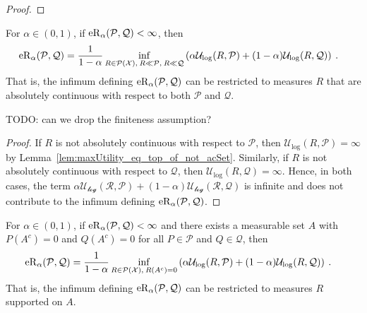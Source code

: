 \begin{proof}\leanok

\end{proof}


\begin{lemma}\label{lem:erenyiDiv_eq_iInf_acSet}
For $\alpha \in (0,1)$, if $\operatorname{eR}_\alpha(\mathcal{P}, \mathcal{Q}) < \infty$, then
\begin{align*}
  \operatorname{eR}_\alpha(\mathcal{P}, \mathcal{Q})
  &= \frac{1}{1 - \alpha} \inf_{R \in \mathcal{P}(\mathcal{X}), \: R \ll \mathcal{P}, \: R \ll \mathcal{Q}} \left( \alpha \mathcal{U}_{\log}(R, \mathcal{P}) + (1 - \alpha) \mathcal{U}_{\log}(R, \mathcal{Q}) \right)
  \: .
\end{align*}
That is, the infimum defining $\operatorname{eR}_\alpha(\mathcal{P}, \mathcal{Q})$ can be restricted to measures $R$ that are absolutely continuous with respect to both $\mathcal{P}$ and $\mathcal{Q}$.

TODO: can we drop the finiteness assumption?
\end{lemma}

\begin{proof}
If $R$ is not absolutely continuous with respect to $\mathcal{P}$, then $\mathcal{U}_{\log}(R, \mathcal{P}) = \infty$ by Lemma~\ref{lem:maxUtility_eq_top_of_not_acSet}.
Similarly, if $R$ is not absolutely continuous with respect to $\mathcal{Q}$, then $\mathcal{U}_{\log}(R, \mathcal{Q}) = \infty$.
Hence, in both cases, the term $\alpha \mathcal{U_{\log}(R, \mathcal{P}) + (1 - \alpha) \mathcal{U}_{\log}(R, \mathcal{Q})}$ is infinite and does not contribute to the infimum defining $\operatorname{eR}_\alpha(\mathcal{P}, \mathcal{Q})$.
\end{proof}


\begin{corollary}\label{cor:erenyiDiv_eq_iInf_support}
For $\alpha \in (0,1)$, if $\operatorname{eR}_\alpha(\mathcal{P}, \mathcal{Q}) < \infty$ and there exists a measurable set $A$ with $P(A^c) = 0$ and $Q(A^c) = 0$ for all $P \in \mathcal{P}$ and $Q \in \mathcal{Q}$, then
\begin{align*}
  \operatorname{eR}_\alpha(\mathcal{P}, \mathcal{Q})
  &= \frac{1}{1 - \alpha} \inf_{R \in \mathcal{P}(\mathcal{X}), \: R(A^c) = 0} \left( \alpha \mathcal{U}_{\log}(R, \mathcal{P}) + (1 - \alpha) \mathcal{U}_{\log}(R, \mathcal{Q}) \right)
  \: .
\end{align*}
That is, the infimum defining $\operatorname{eR}_\alpha(\mathcal{P}, \mathcal{Q})$ can be restricted to measures $R$ supported on $A$.
\end{corollary}

